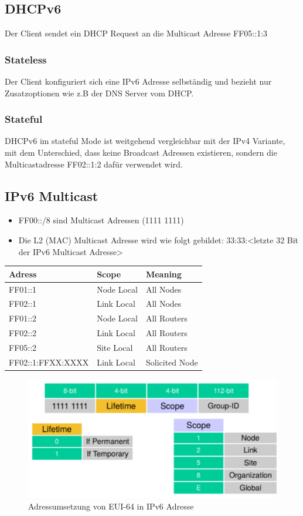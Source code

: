 \subsection{DHCPv6}
Der Client sendet ein DHCP Request an die Multicast Adresse FF05::1:3
\subsubsection{Stateless}
Der Client konfiguriert sich eine IPv6 Adresse selbständig und bezieht nur Zusatzoptionen wie z.B der DNS Server vom DHCP.

\subsubsection{Stateful}
DHCPv6 im stateful Mode ist weitgehend vergleichbar mit der IPv4 Variante, mit dem Unterschied, dass keine Broadcast Adressen existieren, sondern die Multicastadresse FF02::1:2 dafür verwendet wird.	

\subsection{IPv6 Multicast}
\begin{itemize}
	\item FF00::/8 sind Multicast Adressen (1111 1111)
	\item Die L2 (MAC) Multicast Adresse wird wie folgt gebildet: 33:33:<letzte 32 Bit der IPv6 Multicast Adresse>
\end{itemize}

\begin{tabu} to \linewidth {|l|l|l|}
	\hline
	Adress 	& Scope & Meaning \\ 
	\hline\hline
	FF01::1		& Node Local	& All Nodes  \\ 
	\hline
	FF02::1		& Link Local	& All Nodes \\ 
	\hline
	FF01::2		& Node Local	& All Routers \\ 
	\hline
	FF02::2		& Link Local	& All Routers \\ 
	\hline
	FF05::2		& Site Local 	& All Routers  \\ 
	\hline
	FF02::1:FFXX:XXXX	& Link Local 	& Solicited Node  \\ 
	\hline
\end{tabu}

\begin{figure}[h]
	\centering
	\includegraphics[width=0.4\linewidth]{images/ipv6_multicast.pdf}
	\caption{Adressumsetzung von EUI-64 in IPv6 Adresse}
\end{figure}

